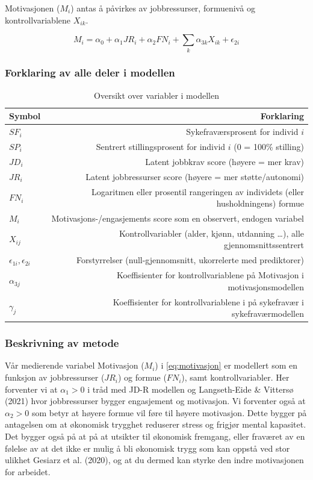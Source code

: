 \documentclass[
  12pt,
  a4paper,
  DIV=11,
  numbers=noendperiod]{scrartcl}
\begin{document}
Motivasjonen (\(M_i\)) antas å påvirkes av jobbressurser, formuenivå og
kontrollvariablene \(X_{ik}\).

\[
M_i = \alpha_0 + \alpha_1 JR_i + \alpha_2 FN_i + \sum_k \alpha_{3k}X_{ik} + \epsilon_{2i} \tag{Motivasjon}\label{eq:motivasjon}
\]

\subsubsection{Forklaring av alle deler i
modellen}\label{forklaring-av-alle-deler-i-modellen}

\begin{table}[H]
\centering
\begin{tabular}{lr}
\toprule
Symbol & Forklaring \\ 
\midrule
$SF_i$ & Sykefraværsprosent for individ $i$ \\
$SP_i$ & Sentrert stillingsprosent for individ $i$ (0 = 100\% stilling) \\
$JD_i$ & Latent jobbkrav score (høyere = mer krav) \\
$JR_i$ & Latent jobbressurser score (høyere = mer støtte/autonomi) \\
$FN_i$ & Logaritmen eller prosentil rangeringen av individets (eller husholdningens) formue \\
$M_i$ & Motivasjons-/engasjements score som en observert, endogen variabel \\
$X_{ij}$ & Kontrollvariabler (alder, kjønn, utdanning …), alle gjennomsnittssentrert \\
$\epsilon_{1i}, \epsilon_{2i}$ & Forstyrrelser (null-gjennomsnitt, ukorrelerte med prediktorer) \\  
$\alpha_{3j} $ & Koeffisienter for kontrollvariablene på Motivasjon i motivasjonsmodellen \\
$\gamma_{j} $ & Koeffisienter for kontrollvariablene i på sykefravær i sykefraværmodellen \\
\hline
\end{tabular}
\caption{Oversikt over variabler i modellen}
\label{tab:variabler}
\end{table}

\subsubsection{Beskrivning av metode}\label{beskrivning-av-metode}

Vår medierende variabel Motivasjon (\(M_i\)) i \autoref{eq:motivasjon}
er modellert som en funksjon av jobbressurser (\(JR_i\)) og formue
(\(FN_i\)), samt kontrollvariabler. Her forventer vi at \(\alpha_1 > 0\)
i tråd med JD-R modellen og Langseth-Eide \& Vittersø (2021) hvor
jobbressurser bygger engasjement og motivasjon. Vi forventer også at
\(\alpha_2 > 0\) som betyr at høyere formue vil føre til høyere
motivasjon. Dette bygger på antagelsen om at økonomisk trygghet
reduserer stress og frigjør mental kapasitet. Det bygger også på at på
at utsikter til økonomisk fremgang, eller fraværet av en følelse av at
det ikke er mulig å bli økonomisk trygg som kan oppstå ved stor ulikhet
Gesiarz et al. (2020), og at du dermed kan styrke den indre motivasjonen
for arbeidet.
\end{document}
